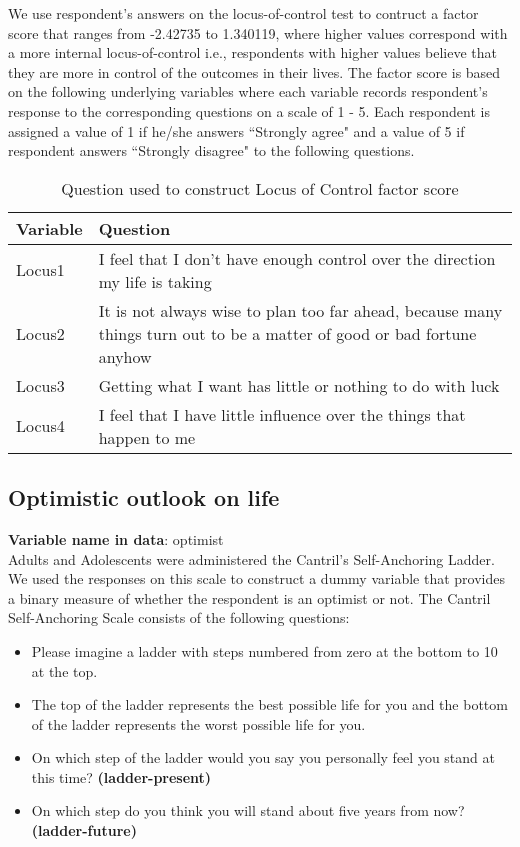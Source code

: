 We use respondent's answers on the locus-of-control test to contruct a factor score that ranges from -2.42735 to 1.340119, where higher values correspond with a more internal locus-of-control i.e., respondents with higher values believe that they are more in control of the outcomes in their lives. The factor score is based on the following underlying variables where each variable records respondent's response to the corresponding questions on a scale of 1 - 5. Each respondent is assigned a value of 1 if he/she answers ``Strongly agree" and a value of 5 if respondent answers ``Strongly disagree" to the following questions. \\

\begin{table}[H]
\begin{center}
\footnotesize{
\caption{Question used to construct Locus of Control factor score}
	\begin{tabular}{l L{11cm}}
	\hline
	\textbf{Variable} & \textbf{Question} \\
	\hline
	
	Locus1		& I feel that I don’t have enough control over the direction my life is taking \\	
	Locus2		& It is not always wise to plan too far ahead, because many things turn out to be a matter of good or bad fortune anyhow\\
	Locus3		& Getting what I want has little or nothing to do with luck \\
	Locus4		& I feel that I have little influence over the things that happen to me \\
	
	\hline
	
	\end{tabular}
}

\end{center}
\end{table}

\subsection{Optimistic outlook on life}
\textbf{Variable name in data}: optimist \\[.3cm]
Adults and Adolescents were administered the Cantril's Self-Anchoring Ladder. We used the responses on this scale to construct a dummy variable that provides a binary measure of whether the respondent is an optimist or not. The Cantril Self-Anchoring Scale consists of the following questions:
\begin{itemize}
\item Please imagine a ladder with steps numbered from zero at the bottom to 10 at the top.
\item The top of the ladder represents the best possible life for you and the bottom of the ladder represents the worst possible life for you.
\item On which step of the ladder would you say you personally feel you stand at this time? \textbf{(ladder-present)}
\item On which step do you think you will stand about five years from now? \textbf{(ladder-future)}
\end{itemize}

